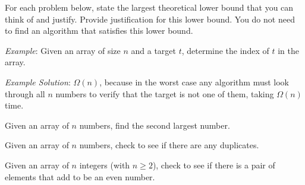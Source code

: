 \begin{prob}
    For each problem below, state the largest theoretical lower bound that you can think
    of and justify.
    Provide justification for this lower bound. You do not need to find an algorithm
    that satisfies this lower bound.

    \emph{Example}: Given an array of size $n$ and a target $t$, determine the index of $t$ in the array.

    \emph{Example Solution}: $\Omega(n)$, because in the worst case any
    algorithm must look through all $n$ numbers to verify that the target is
    not one of them, taking $\Omega(n)$ time.

    \begin{subprobset}
        \begin{subprob}
            Given an array of $n$ numbers, find the second largest number.

            \begin{soln}
            
            \end{soln}
        \end{subprob}

        \begin{subprob}
            Given an array of $n$ numbers, check to see if there are any duplicates.

            \begin{soln}
            
            \end{soln}
        \end{subprob}

        \begin{subprob}
            Given an array of $n$ integers (with $n \geq 2$), check to see if there is
            a pair of elements that add to be an even number.

            \begin{soln}
            
            \end{soln}
        \end{subprob}

    \end{subprobset}

\end{prob}

